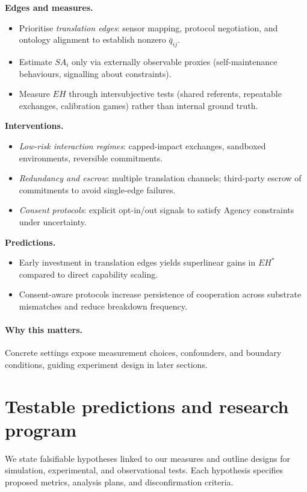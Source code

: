 \documentclass[12pt]{article}
\begin{document}
\noindent\textbf{Edges and measures.}
\begin{itemize}[leftmargin=1.2em]
\item Prioritise \emph{translation edges}: sensor mapping, protocol negotiation, and ontology alignment to establish nonzero $\bar{q}_{ij}$.
\item Estimate $SA_i$ only via externally observable proxies (self-maintenance behaviours, signalling about constraints).
\item Measure $EH$ through intersubjective tests (shared referents, repeatable exchanges, calibration games) rather than internal ground truth.
\end{itemize}

\noindent\textbf{Interventions.}
\begin{itemize}[leftmargin=1.2em]
\item \emph{Low-risk interaction regimes}: capped-impact exchanges, sandboxed environments, reversible commitments.
\item \emph{Redundancy and escrow}: multiple translation channels; third-party escrow of commitments to avoid single-edge failures.
\item \emph{Consent protocols}: explicit opt-in/out signals to satisfy Agency constraints under uncertainty.
\end{itemize}

\noindent\textbf{Predictions.}
\begin{itemize}[leftmargin=1.2em]
\item Early investment in translation edges yields superlinear gains in $EH^\ast$ compared to direct capability scaling.
\item Consent-aware protocols increase persistence of cooperation across substrate mismatches and reduce breakdown frequency.
\end{itemize}

\paragraph{Why this matters.} Concrete settings expose measurement choices, confounders, and boundary conditions, guiding experiment design in later sections.
\section{Testable predictions and research program}\label{sec:predictions}
We state falsifiable hypotheses linked to our measures and outline designs for simulation, experimental, and observational tests. Each hypothesis specifies proposed metrics, analysis plans, and disconfirmation criteria.
\end{document}
